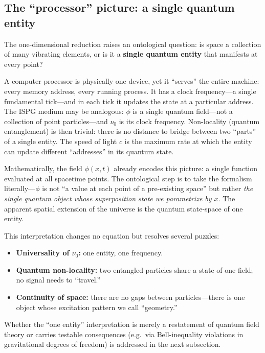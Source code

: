 \documentclass[11pt]{article}
\begin{document}
\subsection{The ``processor'' picture:
a single quantum entity}
\label{sec:processor}

The one-dimensional reduction raises an
ontological question: is space a collection of
many vibrating elements, or is it a
\textbf{single quantum entity} that manifests
at every point?

A computer processor is physically one device,
yet it ``serves'' the entire machine: every
memory address, every running process.  It has a
clock frequency---a single fundamental tick---and
in each tick it updates the state at a particular
address.  The ISPG medium may be analogous:
$\phi$ is a single quantum field---not a
collection of point particles---and $\nu_0$ is
its clock frequency.  Non-locality (quantum
entanglement) is then trivial: there is no
distance to bridge between two ``parts'' of a
single entity.  The speed of light $c$ is the
maximum rate at which the entity can update
different ``addresses'' in its quantum state.

Mathematically, the field $\phi(x,t)$ already
encodes this picture: a single function
evaluated at all spacetime points.
The ontological step is to take the formalism
literally---$\phi$ is not ``a value at each
point of a pre-existing space'' but rather
\emph{the single quantum object whose
superposition state we parametrize by $x$}.
The apparent spatial extension of the universe
is the quantum state-space of one entity.

This interpretation changes no equation but
resolves several puzzles:
\begin{itemize}
  \item \textbf{Universality of $\nu_0$:}
    one entity, one frequency.
  \item \textbf{Quantum non-locality:}
    two entangled particles share a state
    of one field; no signal needs to ``travel.''
  \item \textbf{Continuity of space:}
    there are no gaps between particles---there
    is one object whose excitation pattern we
    call ``geometry.''
\end{itemize}

Whether the ``one entity'' interpretation is
merely a restatement of quantum field theory
or carries testable consequences (e.g.\ via
Bell-inequality violations in gravitational
degrees of freedom) is addressed in the next
subsection.
\end{document}
